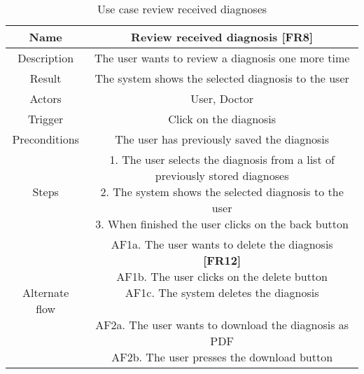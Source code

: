 \begin{table}[H]
	\begin{center}\scriptsize
		\def\arraystretch{2}%
		\begin{tabular}{ |c|c| } 
			\hline
			Name & Review received diagnosis \textbf{[FR8]}\\
			\hline	
			Description & The user wants to review a diagnosis one more time \\ 
			\hline
			Result & The system shows the selected diagnosis to the user\\ 
			\hline
			Actors & User, Doctor \\ 
			\hline
			Trigger & Click on the diagnosis \\ 
			\hline
			Preconditions & The user has previously saved the diagnosis \\ 
			\hline
			Steps & \parbox{9cm}{\vspace{.5\baselineskip}1. The user selects the diagnosis from a list of previously stored diagnoses\\2. The system shows the selected diagnosis to the user \\ 3. When finished the user clicks on the back button}\\
			\hline
			Alternate flow & \parbox{9cm}{\vspace{.5\baselineskip}
				AF1a. The user wants to delete the diagnosis \textbf{[FR12]}\\
				AF1b. The user clicks on the delete button\\
				AF1c. The system deletes the diagnosis\\\\
				AF2a. The user wants to download the diagnosis as PDF\\
				AF2b. The user presses the download button}\\
			\hline
		\end{tabular}\normalsize
	\end{center}
	\caption{Use case review received diagnoses}
\end{table}
